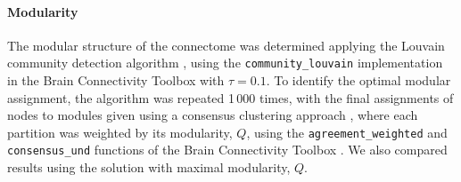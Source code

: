 \documentclass[10pt,letterpaper]{article}
\begin{document}
\paragraph{Modularity}
The modular structure of the connectome was determined applying the Louvain community detection algorithm \cite{Blondel:2008do}, using the \texttt{community\_louvain} implementation in the Brain Connectivity Toolbox \cite{Rubinov2010} with $\tau = 0.1$.
To identify the optimal modular assignment, the algorithm was repeated 1\,000 times, with the final assignments of nodes to modules given using a consensus clustering approach \cite{Lancichinetti2012}, where each partition was weighted by its modularity, $Q$, using the \texttt{agreement\_weighted} and \texttt{consensus\_und} functions of the Brain Connectivity Toolbox \cite{Rubinov2010}.
We also compared results using the solution with maximal modularity, $Q$.



\end{document}
